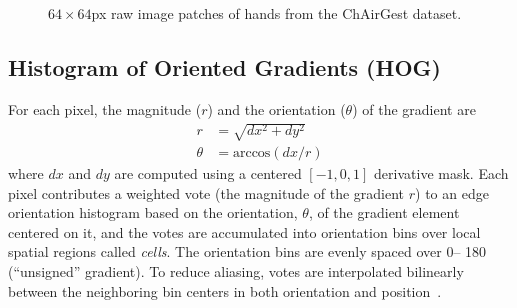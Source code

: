\begin{figure}[tbh]
  \centering
  \caption{$64\times64$px raw image patches of hands from the ChAirGest
  dataset.}
  \label{fig:hand}
\end{figure}

\subsection{Histogram of Oriented Gradients (HOG)}
For each pixel, the magnitude ($r$) and the orientation ($\theta$) of the
gradient are
\begin{align*}
r &= \sqrt{dx^2 + dy^2} \\
\theta &= \text{arccos}(dx / r) 
\end{align*}
where $dx$ and $dy$ are computed using a centered $[-1, 0, 1]$ derivative mask.
Each pixel contributes a weighted vote (the magnitude of the gradient $r$) to an
edge orientation histogram based on the orientation, $\theta$, of the gradient
element centered on it, and the votes are accumulated into orientation bins over local spatial regions called
\textit{cells}.
The orientation bins are evenly spaced over 0\textdegree -- 180\textdegree
(``unsigned'' gradient). To reduce aliasing, votes are interpolated
bilinearly between the neighboring bin centers in both orientation and
position~\cite{dalal05}. 


